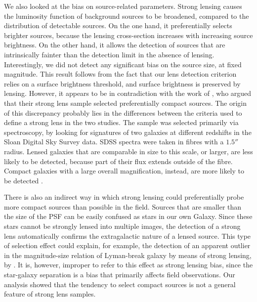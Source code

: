 \documentclass{aa}
\begin{document}
We also looked at the bias on source-related parameters.
Strong lensing causes the luminosity function of background sources to be broadened, compared to the distribution of detectable sources.
On the one hand, it preferentially selects brighter sources, because the lensing cross-section increases with increasing source brightness.
On the other hand, it allows the detection of sources that are intrinsically fainter than the detection limit in the absence of lensing.
Interestingly, we did not detect any significant bias on the source size, at fixed magnitude.
This result follows from the fact that our lens detection criterion relies on a surface brightness threshold, and surface brightness is preserved by lensing.
However, it appears to be in contradiction with the work of \citet{O+A17}, who argued that their strong lens sample selected preferentially compact sources.
The origin of this discrepancy probably lies in the differences between the criteria used to define a strong lens in the two studies.
The \citet{O+A17} sample was selected primarily via spectroscopy, by looking for signatures of two galaxies at different redshifts in the Sloan Digital Sky Survey \citep[SDSS][]{Yor++00} data.
SDSS spectra were taken in fibres with a $1.5''$ radius.
Lensed galaxies that are comparable in size to this scale, or larger, are less likely to be detected, because part of their flux extends outside of the fibre. Compact galaxies with a large overall magnification, instead, are more likely to be detected \citep[see the discussion in section 5.3 of][]{O+A17}.

There is also an indirect way in which strong lensing could preferentially probe more compact sources than possible in the field.
Sources that are smaller than the size of the PSF can be easily confused as stars in our own Galaxy.
Since these stars cannot be strongly lensed into multiple images, the detection of a strong lens automatically confirms the extragalactic nature of a lensed source.
This type of selection effect could explain, for example, the detection of an apparent outlier in the magnitude-size relation of Lyman-break galaxy by means of strong lensing, by \citet{Jae++20}.
It is, however, improper to refer to this effect as strong lensing bias, since the star-galaxy separation is a bias that primarily affects field observations.
Our analysis showed that the tendency to select compact sources is not a general feature of strong lens samples.
\end{document}
